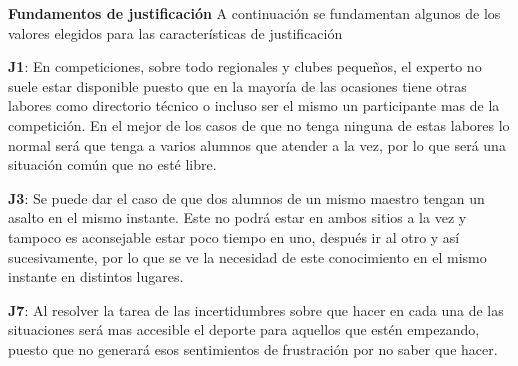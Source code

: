 \textbf{Fundamentos de justificación}
A continuación se fundamentan algunos de los valores elegidos para las características de justificación

\begin{compactitem}
  \item[\textbf{J1}:] En competiciones, sobre todo regionales y clubes pequeños, el experto
     no suele estar disponible puesto que en la mayoría de las ocasiones tiene otras labores
     como directorio técnico o incluso ser el mismo un participante mas de la competición.
     En el mejor de los casos de que no tenga ninguna de estas labores lo normal será que
     tenga a varios alumnos que atender a la vez, por lo que será una situación común que no esté libre.
  \item[\textbf{J3}:] Se puede dar el caso de que dos alumnos de un mismo maestro tengan un
     asalto en el mismo instante. Este no podrá estar en ambos sitios a la vez y tampoco es
     aconsejable estar poco tiempo en uno, después ir al otro y así sucesivamente, por lo que
     se ve la necesidad de este conocimiento en el mismo instante en distintos lugares.
  \item[\textbf{J7}:] Al resolver la tarea de las incertidumbres sobre que hacer
     en cada una de las situaciones será mas accesible el deporte para aquellos que estén
     empezando, puesto que no generará esos sentimientos de frustración por no saber que hacer.
\end{compactitem}
\newpage

